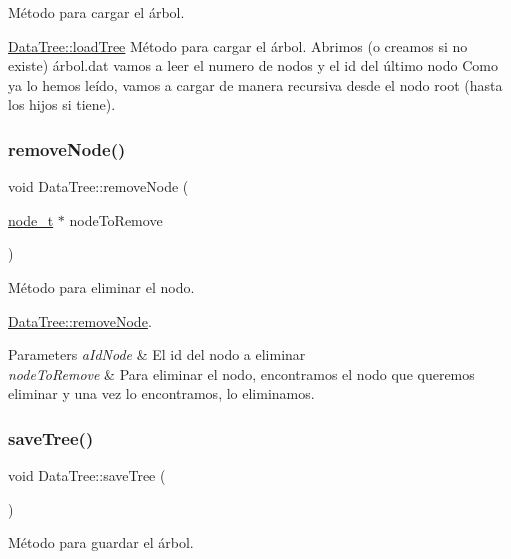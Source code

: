 Método para cargar el árbol. 

\hyperlink{classDataTree_ade69ae1d6b9c9c0b61abcb397fef1484}{Data\+Tree\+::load\+Tree} Método para cargar el árbol. Abrimos (o creamos si no existe) árbol.\+dat vamos a leer el numero de nodos y el id del último nodo Como ya lo hemos leído, vamos a cargar de manera recursiva desde el nodo root (hasta los hijos si tiene). \mbox{\label{classDataTree_ad5cf54ba01f825be5feb7c4a9c42a1ae}} 
\subsubsection{\texorpdfstring{remove\+Node()}{removeNode()}}
{\footnotesize\ttfamily void Data\+Tree\+::remove\+Node (\begin{DoxyParamCaption}\item[{\hyperlink{structnode__t}{node\+\_\+t} $\ast$}]{node\+To\+Remove }\end{DoxyParamCaption})}



Método para eliminar el nodo. 

\hyperlink{classDataTree_ad5cf54ba01f825be5feb7c4a9c42a1ae}{Data\+Tree\+::remove\+Node}.


\begin{DoxyParams}{Parameters}
{\em a\+Id\+Node} & El id del nodo a eliminar\\
\hline
{\em node\+To\+Remove} & Para eliminar el nodo, encontramos el nodo que queremos eliminar y una vez lo encontramos, lo eliminamos. \\
\hline
\end{DoxyParams}
\mbox{\label{classDataTree_ad82644547c535fa1802e166efb211a88}} 
\subsubsection{\texorpdfstring{save\+Tree()}{saveTree()}}
{\footnotesize\ttfamily void Data\+Tree\+::save\+Tree (\begin{DoxyParamCaption}{ }\end{DoxyParamCaption})}



Método para guardar el árbol. 

